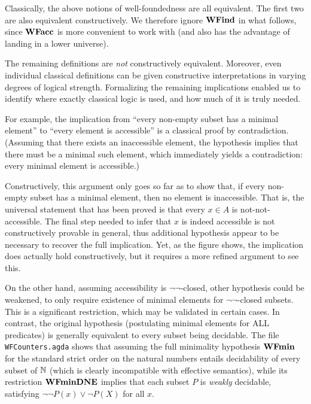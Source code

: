 Classically, the above notions of well-foundedness are all equivalent.  The first two 
are also equivalent constructively. We therefore ignore $\mathbf{WFind}$ in what follows, since $\mathbf{WFacc}$ is more convenient to work with (and also has the advantage of landing in a lower universe).

The remaining definitions are \emph{not} constructively equivalent. Moreover, even individual classical definitions can be given constructive
interpretations in varying degrees of logical strength.
Formalizing the remaining implications enabled us to identify where exactly classical logic is used, and how much of it is truly needed.

For example, the implication from ``every non-empty subset has a minimal element'' to
``every element is accessible''  is a classical proof by contradiction.
(Assuming that there exists an inaccessible element, the hypothesis implies that
there must be a minimal such element, which immediately yields a contradiction:
every minimal element is accessible.)

Constructively, this argument only goes so far as to show that, if every non-empty
subset has a minimal element, then no element is inaccessible.
That is, the universal statement that has been proved is that every $x \in A$
is not-not-accessible. The final step needed to infer that $x$ is indeed accessible
is not constructively provable in general, thus additional hypothesis appear to be necessary to recover the full implication. Yet, as the figure shows, the implication does actually hold constructively, but it requires a more refined argument to see this.

On the other hand, assuming accessibility is $\lnot\lnot$-closed, other
hypothesis could be weakened, to only require existence of minimal elements
for $\lnot\lnot$-closed subsets.  This is a significant restriction, which may
be validated in certain cases.  In contrast, the original hypothesis
(postulating minimal elements for ALL predicates)
is generally equivalent to every subset being decidable.
The file \texttt{WFCounters.agda} shows that assuming the full minimality hypothesis $\mathbf{WFmin}$ for the standard strict order on the natural numbers entails decidability of every subset of $\mathbb{N}$ (which is clearly incompatible with effective semantics), while its restriction $\mathbf{WFminDNE}$ implies
that each subset $P$ is \emph{weakly} decidable,
satisfying $\lnot \lnot P(x) \lor \lnot P(X)$ for all $x$.


